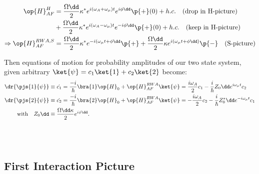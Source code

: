 \begin{align}
\op{H}_{AF}^H &= \frac{\Omega\dd}{2} \kappa^* e^{i(\omega_A + \omega_\mu)t}e^{i\phi\dd}\p{+}(0) + h.c. \quad \text{(drop in H-picture)}\\
&+ \frac{\Omega\dd}{2} \kappa^* e^{i(\omega_A - \omega_\mu )t}e^{-i\phi\dd}\p{+}(0) + h.c. \quad \text{(keep in H-picture)} \\
\Rightarrow  \op{H}_{AF}^{RWA, S} &= \frac{\Omega\dd}{2} \kappa^*
 e^{-i( \omega_\mu t + \phi\dd}\p{+} + \frac{\Omega\dd}{2} \kappa e^{i( \omega_\mu t + \phi\dd)}\p{-} \quad \text{(S-picture)}
\end{align}

Then equations of motion for probability amplitudes of our two state system, given arbitrary $\ket{\psi} = c_1 \ket{1} + c_2\ket{2} $ become:
\begin{align}
\dr{\pjs{1}{\psi}} &\equiv \dot{c_1} = \frac{-i}{\hbar}\bra{1} \op{H}_0 + \op{H}_{AF}^{RWA}
  \ket{\psi} = \frac{i\omega_A }{2}c_1 - \frac{i}{\hbar}Z_0\dd e^{i\omega_\mu t}c_2\\
\dr{\pjs{2}{\psi}} &\equiv \dot{c_2} = \frac{-i}{\hbar}\bra{2} \op{H}_0 + \op{H}_{AF}^{RWA}  \ket{\psi} = -\frac{i\omega_A }{2}c_2 - \frac{i}{\hbar}Z_0^*\dd e^{-i\omega_\mu t}c_1\\
\text{with} \quad Z_0\dd &\equiv \frac{\Omega\dd\kappa}{2}e^{i\phi\dd}.
\end{align}
\\
\\
\subsection{First Interaction Picture}

